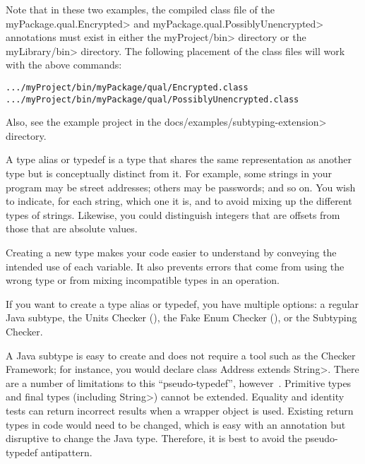 \begin{enumerate}
\begin{sloppypar}
Note that in these two examples, the compiled class file of the
\<myPackage.qual.Encrypted> and \<myPackage.qual.PossiblyUnencrypted> annotations
must exist in either the \<myProject/bin> directory or the \<myLibrary/bin>
directory. The following placement of the class files will work with the above
commands:
\end{sloppypar}

\begin{alltt}
  .../myProject/bin/myPackage/qual/Encrypted.class
  .../myProject/bin/myPackage/qual/PossiblyUnencrypted.class
\end{alltt}

\end{enumerate}

Also, see the example project in the \<docs/examples/subtyping-extension> directory.



A type alias or typedef is a type that shares the same representation as
another type but is conceptually distinct from it.  For example, some
strings in your program may be street addresses; others may be passwords;
and so on.  You wish to indicate, for each string, which one it is, and to
avoid mixing up the different types of strings.  Likewise, you could
distinguish integers that are offsets from those that are absolute values.

Creating a new type makes your code easier to understand by conveying the
intended use of each variable.  It also prevents errors that come from
using the wrong type or from mixing incompatible types in an operation.

If you want to create a type alias or typedef, you have multiple options:
a regular Java subtype,
the Units Checker (),
the Fake Enum Checker (), or
the Subtyping Checker.

A Java subtype is easy to create and does not require a tool such as the
Checker Framework; for instance, you would declare \<class Address extends
String>.  There are a number of limitations to this ``pseudo-typedef'',
however~\cite{Goetz2006:typedef}.
Primitive types and final types (including \<String>) cannot be extended.
Equality and identity tests can return incorrect results when a wrapper
object is used.  Existing return types in code would need to be changed,
which is easy with an annotation but disruptive to change the Java type.
Therefore, it is best to avoid the pseudo-typedef antipattern.

